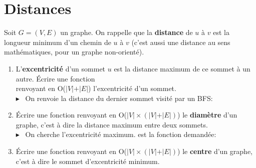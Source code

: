 \documentclass[mp2i]{exam}
\begin{document}
	\section{Distances}
	Soit $G = (V, E)$ un graphe. On rappelle que la \textbf{distance} de $u$ à $v$ est la longueur minimum d'un chemin de $u$ à $v$ (c'est aussi une distance au sens mathématiques, pour un graphe non-orienté).
	\begin{enumerate}
		\item L'\textbf{excentricité} d'un sommet $u$ est la distance maximum de ce sommet à un autre. Écrire une fonction \\  renvoyant en O($\vert V \vert + \vert E \vert$) l'excentricité d'un sommet.
		\if{}
		\\$\blacktriangleright$~ On renvoie la distance du dernier sommet visité par un BFS:
		\begin{center}
		\end{center}
		\fi 
		\item Écrire une fonction  renvoyant en O($\vert V \vert \times (\vert V \vert + \vert E \vert)$) le \textbf{diamètre} d'un graphe, c'est à dire la distance maximum entre deux sommets.
		\if{}
		\\$\blacktriangleright$~ On cherche l'excentricité maximum.  est la fonction demandée:
		\begin{center}
		\end{center}
		\fi 
		\item Écrire une fonction  renvoyant en O($\vert V \vert \times (\vert V \vert + \vert E \vert)$) le \textbf{centre} d'un graphe, c'est à dire le sommet d'excentricité minimum.

\end{enumerate}
\end{document}
